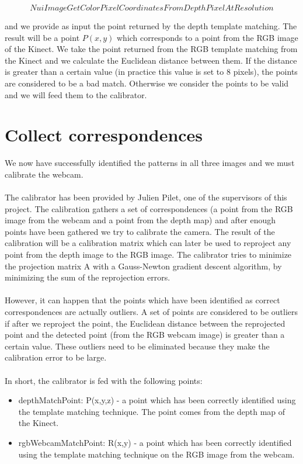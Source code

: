 $$ NuiImageGetColorPixelCoordinatesFromDepthPixelAtResolution $$

\noindent
and we provide as input the point returned by the depth template matching. The result will be a point $P(x, y)$ which corresponds to a point from the RGB image of the Kinect. We take the point returned from the RGB template matching from the Kinect and we calculate the Euclidean distance between them. If the distance is greater than a certain value (in practice this value is set to 8 pixels), the points are considered to be a bad match. Otherwise we consider the points to be valid and we will feed them to the calibrator. 

\section{Collect correspondences}
\noindent
We now have successfully identified the patterns in all three images and we must calibrate the webcam. 
\\\\
The calibrator has been provided by Julien Pilet, one of the supervisors of this project. The calibration gathers a set of correspondences (a point from the RGB image from the webcam and a point from the depth map) and after enough points have been gathered we try to calibrate the camera. The result of the calibration will be a calibration matrix which can later be used to reproject any point from the depth image to the RGB image. The calibrator tries to minimize the projection matrix A with a Gauss-Newton gradient descent algorithm, by minimizing the sum of the reprojection errors.
\\\\
However, it can happen that the points which have been identified as correct correspondences are actually outliers. A set of points are considered to be outliers if after we reproject the point, the Euclidean distance between the reprojected point and the detected point (from the RGB webcam image) is greater than a certain value. These outliers need to be eliminated because they make the calibration error to be large. 
\\\\
In short, the calibrator is fed with the following points:
\begin{itemize}
	\item depthMatchPoint: P(x,y,z) - a point which has been correctly identified using the template matching technique. The point comes from the depth map of the Kinect.
	\item rgbWebcamMatchPoint: R(x,y) - a point which has been correctly identified using the template matching technique on the RGB image from the webcam. 
\end{itemize}  

